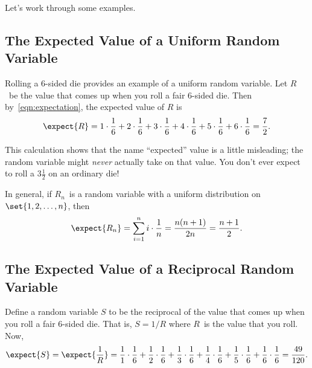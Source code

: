 Let's work through some examples.

\subsection{The Expected Value of a Uniform Random Variable}

Rolling a 6-sided die provides an example of a uniform random
variable.  Let $R$~be the value that comes up when you roll a fair
6-sided die.  Then by~\eqref{eqn:expectation}, the expected value of
$R$ is
\[
\expect{R}
     = 1 \cdot \frac{1}{6} + 2 \cdot \frac{1}{6} + 3 \cdot \frac{1}{6} +
        4 \cdot \frac{1}{6} + 5 \cdot \frac{1}{6} + 6 \cdot \frac{1}{6}
     = \frac{7}{2}.
\]

\iffalse
\begin{align*}
\expect{R}
    & = \sum_{k=1}^6 k \cdot \frac{1}{6} \\
    & = 1 \cdot \frac{1}{6} + 2 \cdot \frac{1}{6} + 3 \cdot \frac{1}{6} +
        4 \cdot \frac{1}{6} + 5 \cdot \frac{1}{6} + 6 \cdot \frac{1}{6} \\
    & = \frac{7}{2}
\end{align*}
\fi

This calculation shows that the name ``expected'' value is a little
misleading; the random variable might \emph{never} actually take on that
value.  You don't ever expect to roll a $3 \frac{1}{2}$ on an ordinary
die!

In general, if $R_n$~is a random variable with a uniform
distribution on~$\set{1, 2, \dots, n}$, then
\[
\expect{R_n}    = \sum_{i = 1}^n i \cdot \frac{1}{n}
                = \frac{n (n + 1)}{2n}
                = \frac{n + 1}{2}.
\]

\subsection{The Expected Value of a Reciprocal Random Variable}

Define a random variable $S$ to be the reciprocal of the value that
comes up when you roll a fair 6-sided die.  That is, $S = 1/R$ where
$R$~is the value that you roll.  Now,
\[
\expect{S}  =\expect{\frac{1}{R}}
            = \frac{1}{1} \cdot \frac{1}{6}
               + \frac{1}{2} \cdot \frac{1}{6}
               + \frac{1}{3} \cdot \frac{1}{6}
               + \frac{1}{4} \cdot \frac{1}{6}
               + \frac{1}{5} \cdot \frac{1}{6}
               + \frac{1}{6} \cdot \frac{1}{6}
               = \frac{49}{120}.
\]

\iffalse
\begin{align*}
\expect{S} & =\expect{\frac{1}{R}}\\
           &  = \frac{1}{1} \cdot \frac{1}{6}
+ \frac{1}{2} \cdot \frac{1}{6}
+ \frac{1}{3} \cdot \frac{1}{6}
+ \frac{1}{4} \cdot \frac{1}{6}
+ \frac{1}{5} \cdot \frac{1}{6}
+ \frac{1}{6} \cdot \frac{1}{6} %
= \frac{49}{120}.
\end{align*}
\fi

